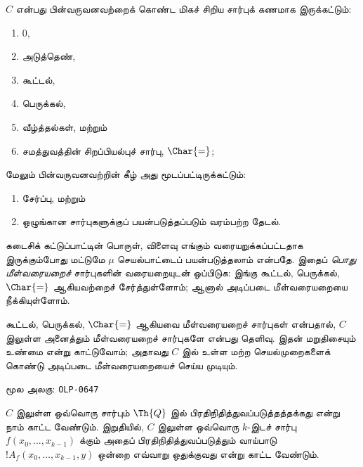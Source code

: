 \documentclass[11pt,a4paper,openany]{memoir}
\begin{document}
$C$ என்பது பின்வருவனவற்றைக் கொண்ட மிகச் சிறிய சார்புக் கணமாக இருக்கட்டும்:
\begin{enumerate}
\item $0$,
\item அடுத்தெண்,
\item கூட்டல்,
\item பெருக்கல்,
\item வீழ்த்தல்கள், மற்றும்
\item சமத்துவத்தின் சிறப்பியல்புச் சார்பு, $\Char{=}$;
\end{enumerate}
மேலும் பின்வருவனவற்றின் கீழ் அது மூடப்பட்டிருக்கட்டும்:
\begin{enumerate}
\item சேர்ப்பு, மற்றும்
\item ஒழுங்கான சார்புகளுக்குப் பயன்படுத்தப்படும் வரம்பற்ற தேடல்.
\end{enumerate}

கடைசிக் கட்டுப்பாட்டின் பொருள், விளைவு எங்கும் வரையறுக்கப்பட்டதாக
இருக்கும்போது மட்டுமே $\mu$ செயல்பாட்டைப் பயன்படுத்தலாம் என்பதே.
இதைப் \emph{பொது மீள்வரையறைச்} சார்புகளின் வரையறையுடன் ஒப்பிடுக:
இங்கு கூட்டல், பெருக்கல், $\Char{=}$ ஆகியவற்றைச் சேர்த்துள்ளோம்;
ஆனால் அடிப்படை மீள்வரையறையை நீக்கியுள்ளோம்.

கூட்டல், பெருக்கல், $\Char{=}$ ஆகியவை மீள்வரையறைச் சார்புகள் என்பதால்,
$C$ இலுள்ள அனைத்தும் மீள்வரையறைச் சார்புகளே என்பது தெளிவு.
இதன் மறுதிசையும் உண்மை என்று காட்டுவோம்; அதாவது $C$ இல் உள்ள மற்ற
செயல்முறைகளைக் கொண்டு அடிப்படை மீள்வரையறையைச் செய்ய முடியும்.



\clearpage
\noindent மூல அலகு: \texttt{OLP-0647}\par





$C$ இலுள்ள ஒவ்வொரு சார்பும் $\Th{Q}$ இல் பிரதிநிதித்துவப்படுத்தத்தக்கது
என்று நாம் காட்ட வேண்டும். இறுதியில், $C$ இலுள்ள ஒவ்வொரு $k$-இடச்
சார்பு $f(x_0,\dots,x_{k-1})$ க்கும் அதைப் பிரதிநிதித்துவப்படுத்தும்
வாய்பாடு $!A_f(x_0,\dots,x_{k-1},y)$ ஒன்றை எவ்வாறு ஒதுக்குவது என்று
காட்ட வேண்டும்.
\end{document}
